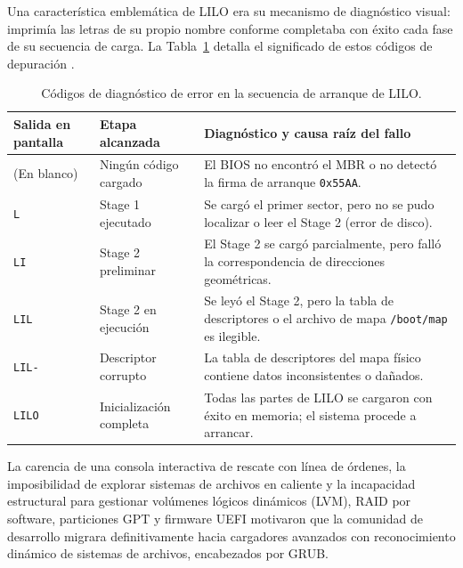 \documentclass[12pt]{article}
\begin{document}
Una característica emblemática de LILO era su mecanismo de diagnóstico visual: imprimía las letras de su propio nombre conforme completaba con éxito cada fase de su secuencia de carga. La Tabla~\ref{tab:diagnosticoLilo} detalla el significado de estos códigos de depuración \parencite{almesberger2000lilo}.

\begin{table}[!t]
\centering
\small
\renewcommand{\arraystretch}{1.1}
\renewcommand{\tabularxcolumn}[1]{m{#1}}
\setlength{\emergencystretch}{1.5em}
\caption{Códigos de diagnóstico de error en la secuencia de arranque de LILO.}
\label{tab:diagnosticoLilo}
\begin{tabularx}{\textwidth}{>{\centering\arraybackslash}m{2.5cm} X X}
\toprule
\textbf{Salida en pantalla} & \textbf{Etapa alcanzada} & \textbf{Diagnóstico y causa raíz del fallo} \\
\midrule
(En blanco) & Ningún código cargado & El BIOS no encontró el MBR o no detectó la firma de arranque \texttt{0x55AA}. \\
\addlinespace
\texttt{L} & Stage 1 ejecutado & Se cargó el primer sector, pero no se pudo localizar o leer el Stage 2 (error de disco). \\
\addlinespace
\texttt{LI} & Stage 2 preliminar & El Stage 2 se cargó parcialmente, pero falló la correspondencia de direcciones geométricas. \\
\addlinespace
\texttt{LIL} & Stage 2 en ejecución & Se leyó el Stage 2, pero la tabla de descriptores o el archivo de mapa \texttt{/boot/map} es ilegible. \\
\addlinespace
\texttt{LIL-} & Descriptor corrupto & La tabla de descriptores del mapa físico contiene datos inconsistentes o dañados. \\
\addlinespace
\texttt{LILO} & Inicialización completa & Todas las partes de LILO se cargaron con éxito en memoria; el sistema procede a arrancar. \\
\bottomrule
\end{tabularx}
\end{table}

La carencia de una consola interactiva de rescate con línea de órdenes, la imposibilidad de explorar sistemas de archivos en caliente y la incapacidad estructural para gestionar volúmenes lógicos dinámicos (LVM), RAID por software, particiones GPT y firmware UEFI motivaron que la comunidad de desarrollo migrara definitivamente hacia cargadores avanzados con reconocimiento dinámico de sistemas de archivos, encabezados por GRUB.
\end{document}
